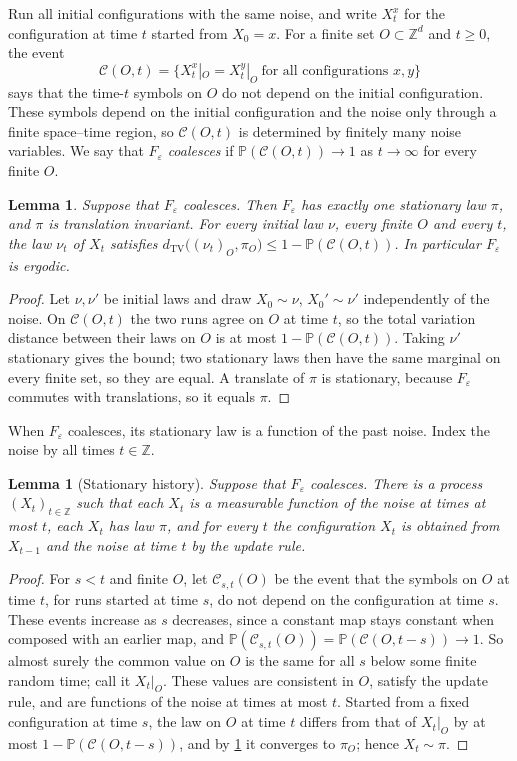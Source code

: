 \documentclass[11pt]{article}
\theoremstyle{plain}
\newtheorem{lemma}[theorem]{Lemma}
\theoremstyle{definition}
\theoremstyle{remark}
\newcommand{\Z}{\mathbb Z}
\newcommand{\Prob}{\mathbb P}
\newcommand{\eps}{\varepsilon}
\newcommand{\dtv}{d_{\mathrm{TV}}}
\begin{document}
Run all initial configurations with the same noise, and write $X_t^x$ for the configuration at time $t$ started from $X_0=x$. For a finite set $O\subset\Z^d$ and $t\ge0$, the event
\[
\mathcal C(O,t)=\bigl\{X^x_t|_O=X^y_t|_O\ \text{for all configurations }x,y\bigr\}
\]
says that the time-$t$ symbols on $O$ do not depend on the initial configuration. These symbols depend on the initial configuration and the noise only through a finite space--time region, so $\mathcal C(O,t)$ is determined by finitely many noise variables. We say that $F_\eps$ \emph{coalesces} if $\Prob(\mathcal C(O,t))\to1$ as $t\to\infty$ for every finite $O$.

\begin{lemma}\label{lem:coalesce}
Suppose that $F_\eps$ coalesces. Then $F_\eps$ has exactly one stationary law $\pi$, and $\pi$ is translation invariant. For every initial law $\nu$, every finite $O$ and every $t$, the law $\nu_t$ of $X_t$ satisfies $\dtv\bigl((\nu_t)_O,\pi_O\bigr)\le1-\Prob(\mathcal C(O,t))$. In particular $F_\eps$ is ergodic.
\end{lemma}

\begin{proof}
Let $\nu,\nu'$ be initial laws and draw $X_0\sim\nu$, $X_0'\sim\nu'$ independently of the noise. On $\mathcal C(O,t)$ the two runs agree on $O$ at time $t$, so the total variation distance between their laws on $O$ is at most $1-\Prob(\mathcal C(O,t))$. Taking $\nu'$ stationary gives the bound; two stationary laws then have the same marginal on every finite set, so they are equal. A translate of $\pi$ is stationary, because $F_\eps$ commutes with translations, so it equals $\pi$.
\end{proof}

When $F_\eps$ coalesces, its stationary law is a function of the past noise. Index the noise by all times $t\in\Z$.

\begin{lemma}[Stationary history]\label{lem:history}
Suppose that $F_\eps$ coalesces. There is a process $(X_t)_{t\in\Z}$ such that each $X_t$ is a measurable function of the noise at times at most $t$, each $X_t$ has law $\pi$, and for every $t$ the configuration $X_t$ is obtained from $X_{t-1}$ and the noise at time $t$ by the update rule.
\end{lemma}

\begin{proof}
For $s<t$ and finite $O$, let $\mathcal C_{s,t}(O)$ be the event that the symbols on $O$ at time $t$, for runs started at time $s$, do not depend on the configuration at time $s$. These events increase as $s$ decreases, since a constant map stays constant when composed with an earlier map, and $\Prob(\mathcal C_{s,t}(O))=\Prob(\mathcal C(O,t-s))\to1$. So almost surely the common value on $O$ is the same for all $s$ below some finite random time; call it $X_t|_O$. These values are consistent in $O$, satisfy the update rule, and are functions of the noise at times at most $t$. Started from a fixed configuration at time $s$, the law on $O$ at time $t$ differs from that of $X_t|_O$ by at most $1-\Prob(\mathcal C(O,t-s))$, and by \cref{lem:coalesce} it converges to $\pi_O$; hence $X_t\sim\pi$.
\end{proof}
\end{document}
